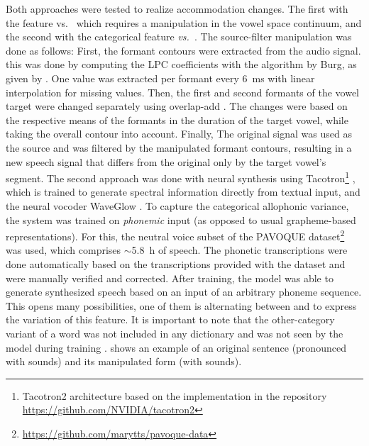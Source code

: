 Both approaches were tested to realize accommodation changes.
The first with the feature \textipa{[E:]} vs.\ \textipa{[e:]} which requires a manipulation in the vowel space continuum, and the second with the categorical feature \emph{\textipa{[\c{c}]} vs.\ \textipa{[k]}}.
The source-filter manipulation was done as follows:
First, the formant contours were extracted from the audio signal.
this was done by computing the LPC coefficients with the algorithm by Burg, as given by \citet{Press1989numerical}.
One value was extracted per formant every \SI{6}{\milli\second} with linear interpolation for missing values.
Then, the first and second formants of the vowel target were changed separately using overlap-add \citep{Hamon1989diphone}.
The changes were based on the respective means of the formants in the duration of the target vowel, while taking the overall contour into account.
Finally, The original signal was used as the source and was filtered by the manipulated formant contours, resulting in a new speech signal that differs from the original only by the target vowel's segment.
The second approach was done with neural synthesis using Tacotron\footnote{Tacotron2 architecture based on the implementation in the repository \url{https://github.com/NVIDIA/tacotron2}} \citep{Shen2018natural}, which is trained to generate spectral information directly from textual input, and the neural vocoder WaveGlow \citep{Prenger2019WaveGlow}.
To capture the categorical allophonic variance, the system was trained on \emph{phonemic} input (as opposed to usual grapheme-based representations).
For this, the neutral voice subset of the PAVOQUE dataset\footnote{\url{https://github.com/marytts/pavoque-data}} \citep{Steiner2013pavoque} was used, which comprises $\sim$\SI{5.8}{\hour} of speech.
The phonetic transcriptions were done automatically based on the transcriptions provided with the dataset and were manually verified and corrected.
After training, the model was able to generate synthesized speech based on an input of an arbitrary phoneme sequence.
This opens many possibilities, one of them is alternating between \textipa{[\c{c}]} and \textipa{[k]} to express the variation of this feature.
It is important to note that the other-category variant of a word was not included in any dictionary and was not seen by the model during training \citep[and see][for more details]{Raveh2021ICASSP}.
 shows an example of an original sentence (pronounced with \textipa{[\c{c}]} sounds) and its manipulated form (with \textipa{[k]} sounds).